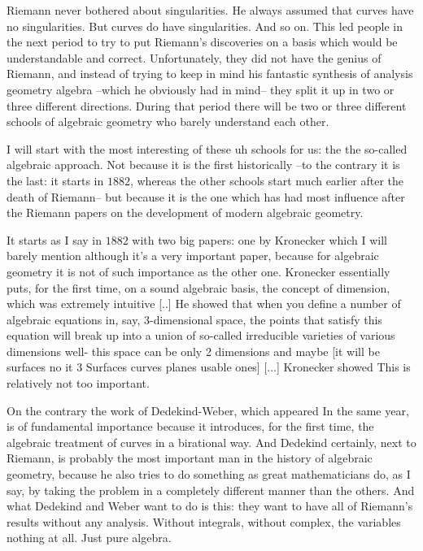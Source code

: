 \documentclass{article}
\begin{document}
Riemann never bothered about singularities.
He always assumed that curves have no singularities.
But curves do have singularities.
And so on.
This led people in the next period 
to try to put Riemann's discoveries 
on a basis which would be understandable and correct.
Unfortunately, they did not have the genius of Riemann,
and instead of trying to keep in mind 
his fantastic synthesis of analysis geometry algebra
--which he obviously had in mind--
they split it up in two or three different directions.
During that period there will be two or three different schools 
of algebraic geometry who barely understand each other.

I will start with the most interesting of these uh schools for us:
the the so-called algebraic approach.
Not because it is the first historically
--to the contrary it is the last:
it starts in $1882$, 
whereas the other schools start much earlier 
after the death of Riemann--
but because it is the one 
which has had most influence 
after the Riemann papers 
on the development of modern algebraic geometry.

It starts as I say in $1882$ with two big papers:
one by Kronecker which I will barely mention 
although it's a very important paper,
because for algebraic geometry 
it is not of such importance as the other one.
Kronecker essentially puts, 
for the first time, 
on a sound algebraic basis, the concept of dimension,
which was extremely intuitive [..]
He showed that when you define a number of algebraic equations
in, say, 3-dimensional space,
the points that satisfy this equation 
will break up into a union 
of so-called irreducible varieties
of various dimensions well- 
this space can be only 2 dimensions and maybe 
[it will be surfaces no it  $3$ Surfaces curves planes
usable ones]
[...] Kronecker showed
This is relatively not too important.

On the contrary the work of Dedekind-Weber, 
which appeared In the same year,
is of fundamental importance 
because it introduces, 
for the first time, 
the algebraic treatment of curves 
in a birational way.
And Dedekind certainly, next to Riemann, 
is probably the most important man 
in the history of algebraic geometry,
because he also tries to do something 
as great mathematicians do, as I say, 
by taking the problem in a completely different manner 
than the others. 
And what Dedekind and Weber want to do is this: 
they want to have all of Riemann's results 
without any analysis.
Without integrals, without complex, the variables nothing at all.
Just pure algebra.
\end{document}
